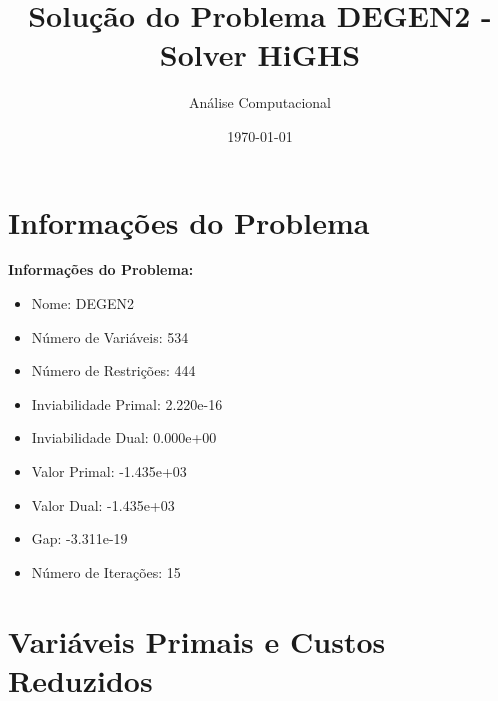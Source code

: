 \documentclass[12pt]{article}
\title{Solução do Problema DEGEN2 - Solver HiGHS}
\author{Análise Computacional}
\date{\today}
\begin{document}
\maketitle

\section{Informações do Problema}

\textbf{Informações do Problema:}
\begin{itemize}
\item Nome: DEGEN2
\item Número de Variáveis: 534
\item Número de Restrições: 444
\item Inviabilidade Primal: 2.220e-16
\item Inviabilidade Dual: 0.000e+00
\item Valor Primal: -1.435e+03
\item Valor Dual: -1.435e+03
\item Gap: -3.311e-19
\item Número de Iterações: 15
\end{itemize}


\section{Variáveis Primais e Custos Reduzidos}
\end{document}
